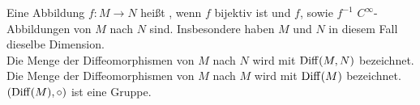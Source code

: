 \begin{dfn}[Diffeomorphismus]
  Eine Abbildung $f \colon M \to N$ hei\ss t , wenn $f$ bijektiv ist und $f$, sowie $f^{-1}$ $C^{\infty}$-Abbildungen von $M$ nach $N$ sind. Insbesondere haben $M$ und $N$ in diesem Fall dieselbe Dimension.\\

Die Menge der Diffeomorphismen von $M$ nach $N$ wird mit $\operatorname{Diff}(M,N)$ bezeichnet. Die Menge der Diffeomorphismen von $M$ nach $M$ wird mit $\operatorname{Diff}(M)$ bezeichnet. $(\operatorname{Diff}(M), \circ)$ ist eine Gruppe.

\end{dfn}

